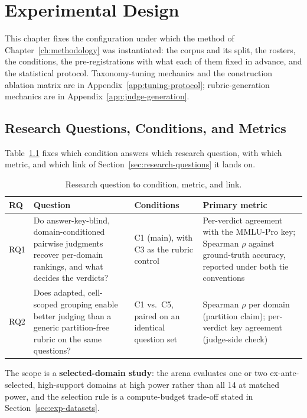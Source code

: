 \chapter{Experimental Design}\label{ch:experimental-design}

This chapter fixes the configuration under which the method of
Chapter~\ref{ch:methodology} was instantiated: the corpus and its
split, the rosters, the conditions, the pre-registrations with what
each of them fixed in advance, and the statistical protocol.
Taxonomy-tuning mechanics and the construction ablation matrix are in
Appendix~\ref{app:tuning-protocol}; rubric-generation mechanics are in
Appendix~\ref{app:judge-generation}.

\section{Research Questions, Conditions, and Metrics}\label{sec:exp-rqmap}

Table~\ref{tab:rq-map} fixes which condition answers which research
question, with which metric, and which link of
Section~\ref{sec:research-questions} it lands on.

\begin{table}[h]
    \centering
    \caption{Research question to condition, metric, and link.}
    \label{tab:rq-map}
    \begin{tabular}{p{0.9cm}p{4.4cm}p{3.0cm}p{4.4cm}}
        \toprule
        RQ & Question & Conditions & Primary metric \\
        \midrule
        RQ1 & Do answer-key-blind, domain-conditioned pairwise
        judgments recover per-domain rankings, and what decides the
        verdicts?
        & C1 (main), with C3 as the rubric control
        & Per-verdict agreement with the MMLU-Pro key; Spearman $\rho$
        against ground-truth accuracy, reported under both tie
        conventions \\
        \addlinespace
        RQ2 & Does adapted, cell-scoped grouping enable better judging
        than a generic partition-free rubric on the same questions?
        & C1 vs.\ C5, paired on an identical question set
        & Spearman $\rho$ per domain (partition claim); per-verdict key
        agreement (judge-side check) \\
        \bottomrule
    \end{tabular}
\end{table}

The scope is a \textbf{selected-domain study}: the arena evaluates one
or two ex-ante-selected, high-support domains at high power rather than
all 14 at matched power, and the selection rule is a compute-budget
trade-off stated in Section~\ref{sec:exp-datasets}.

